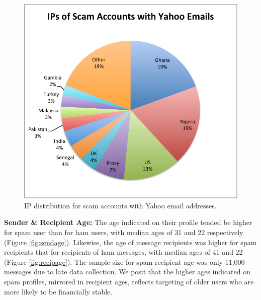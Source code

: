 \documentclass[preprint]{acm_proc_article-sp}
\begin{document}
\begin{figure}[h]
    \centering
    \includegraphics[width=\linewidth]{figures/yahoo-spam.pdf}
    \caption{IP distribution for scam accounts with Yahoo email addresses.}
    \label{fig:yspam}
\end{figure}

\textbf{Sender \& Recipient Age:} The age indicated on their profile tended be higher for spam user than 
for ham users, with median ages of 31 and 22 respectively (Figure \ref{fig:sendage}). Likewise, the 
age of message recipients was higher for spam recipients that for recipients of ham messages, with 
median ages of 41 and 22 (Figure \ref{fig:recipage}). The sample size for spam recipient age 
was only 11,000 messages due to late data collection. We posit that the higher ages indicated on spam profiles, 
mirrored in recipient ages, reflects targeting of older users who are more likely to be financially 
stable. 
\end{document}
